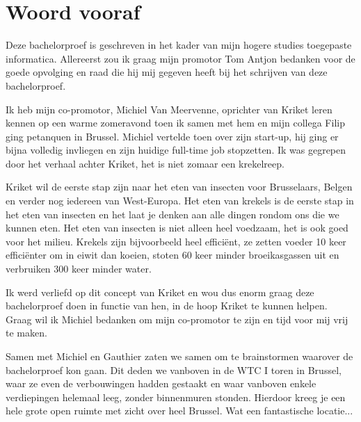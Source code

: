 
\chapter*{Woord vooraf}
\label{ch:voorwoord}


Deze bachelorproef is geschreven in het kader van mijn hogere studies toegepaste informatica. Allereerst zou ik graag mijn promotor Tom Antjon bedanken voor de goede opvolging en raad die hij mij gegeven heeft bij het schrijven van deze bachelorproef. 

Ik heb mijn co-promotor, Michiel Van Meervenne, oprichter van Kriket leren kennen op een warme zomeravond toen ik samen met hem en mijn collega Filip ging petanquen in Brussel. Michiel vertelde toen over zijn start-up, hij ging er bijna volledig invliegen en zijn huidige full-time job stopzetten. Ik was gegrepen door het verhaal achter Kriket, het is niet zomaar een krekelreep. 

Kriket wil de eerste stap zijn naar het eten van insecten voor Brusselaars, Belgen en verder nog iedereen van West-Europa. Het eten van krekels is de eerste stap in het eten van insecten en het laat je denken aan alle dingen rondom ons die we kunnen eten. Het eten van insecten is niet alleen heel voedzaam, het is ook goed voor het milieu. Krekels zijn bijvoorbeeld heel efficiënt, ze zetten voeder 10 keer efficiënter om in eiwit dan koeien, stoten 60 keer minder broeikasgassen uit en verbruiken 300 keer minder water. \autocite{Kriket2018}

Ik werd verliefd op dit concept van Kriket en wou dus enorm graag deze bachelorproef doen in functie van hen, in de hoop Kriket te kunnen helpen. Graag wil ik Michiel bedanken om mijn co-promotor te zijn en tijd voor mij vrij te maken.

Samen met Michiel en Gauthier zaten we samen om te brainstormen waarover de bachelorproef kon gaan. Dit deden we vanboven in de WTC I toren in Brussel, waar ze even de verbouwingen hadden gestaakt en waar vanboven enkele verdiepingen helemaal leeg, zonder binnenmuren stonden. Hierdoor kreeg je een hele grote open ruimte met zicht over heel Brussel. Wat een fantastische locatie...

